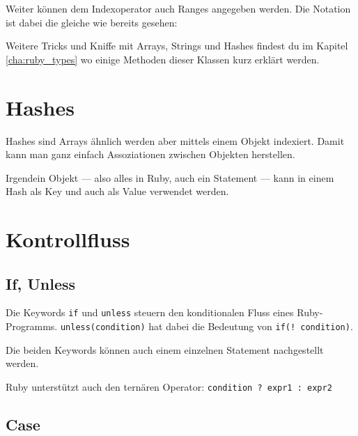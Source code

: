 \documentclass[a4book,11pt,twoside]{scrbook}
\begin{document}




Weiter können dem Indexoperator auch Ranges angegeben werden. Die Notation ist dabei die gleiche wie bereits gesehen:




Weitere Tricks und Kniffe mit Arrays, Strings und Hashes findest du im Kapitel \ref{cha:ruby_types} wo einige Methoden dieser Klassen kurz erklärt werden.


\section{Hashes} %
\label{sub:hashes}
Hashes sind Arrays ähnlich werden aber mittels einem Objekt indexiert. Damit kann man ganz einfach Assoziationen zwischen Objekten herstellen.

Irgendein Objekt — also alles in Ruby, auch ein Statement — kann in einem Hash als Key und auch als Value verwendet werden.









\section{Kontrollfluss} %
\label{sec:kontrollfluss}

\subsection*{If, Unless} %
\label{ssub:if_unless}
Die Keywords \texttt{if} und \texttt{unless} steuern den konditionalen Fluss eines Ruby-Programms. \texttt{unless(condition)} hat dabei die Bedeutung von \texttt{if(! condition)}.

Die beiden Keywords können auch einem einzelnen Statement nachgestellt werden.



Ruby unterstützt auch den ternären Operator: \texttt{condition ? expr1 : expr2}


\subsection*{Case} %
\label{sub:case}
\begin{quotation}
\end{quotation}
\end{document}
